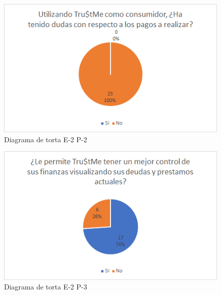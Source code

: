 {{			\begin{figure}[H]
				\centering
				\includegraphics[width=0.8\linewidth]{annexes/e2-p2.png}
				\caption{Diagrama de torta E-2 P-2}
			\end{figure}
			
			\begin{figure}[H]
				\centering
				\includegraphics[width=0.8\linewidth]{annexes/e2-p3.png}
				\caption{Diagrama de torta E-2 P-3}
			\end{figure}
		}
		
	}
	

	